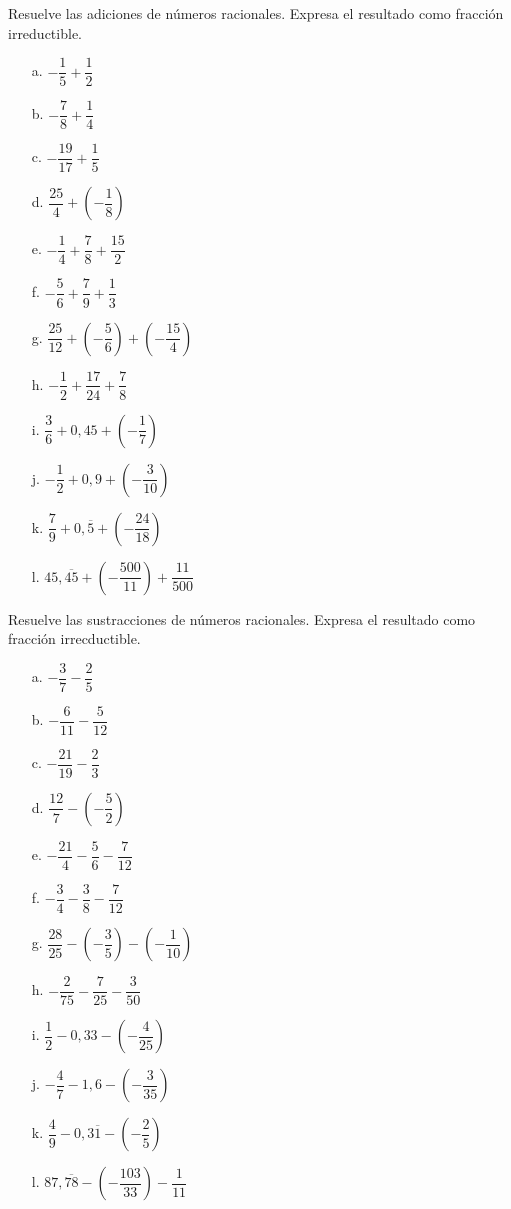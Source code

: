 \documentclass[spanish,letterpaper, 11pt, addpoints, answers]{exam}
\begin{document}
\begin{questions}
  \question Resuelve las adiciones de números racionales. Expresa el resultado como fracción irreductible.
  \begin{multicols}{2}
    \begin{itemize}
      \item[a.] $-\dfrac{1}{5}+\dfrac{1}{2}$
      \item[b.] $-\dfrac{7}{8}+\dfrac{1}{4}$
      \item[c.] $-\dfrac{19}{17}+\dfrac{1}{5}$
      \item[d.] $\dfrac{25}{4}+\left(-\dfrac{1}{8}\right)$
      \item[e.] $-\dfrac{1}{4}+\dfrac{7}{8}+\dfrac{15}{2}$
      \item[f.] $-\dfrac{5}{6}+\dfrac{7}{9}+\dfrac{1}{3}$
      \item[g.] $\dfrac{25}{12}+\left(-\dfrac{5}{6}\right)+\left(-\dfrac{15}{4}\right)$
      \item[h.] $-\dfrac{1}{2}+\dfrac{17}{24}+\dfrac{7}{8}$
      \item[i.] $\dfrac{3}{6}+0{,}45+\left(-\dfrac{1}{7}\right)$
      \item[j.] $-\dfrac{1}{2}+0{,}9+\left(-\dfrac{3}{10}\right)$
      \item[k.] $\dfrac{7}{9}+0{,}\overline{5}+\left(-\dfrac{24}{18}\right)$
      \item[l.] $45{,}\overline{45}+\left(-\dfrac{500}{11}\right)+\dfrac{11}{500}$
    \end{itemize}

  \end{multicols}

  \question Resuelve las sustracciones de números racionales. Expresa el resultado como fracción irrecductible.
  \begin{multicols}{2}
    \begin{itemize}
      \item[a.] $-\dfrac{3}{7}-\dfrac{2}{5}$
      \item[b.] $-\dfrac{6}{11}-\dfrac{5}{12}$
      \item[c.] $-\dfrac{21}{19}-\dfrac{2}{3}$
      \item[d.] $\dfrac{12}{7}-\left(-\dfrac{5}{2}\right)$
      \item[e.] $-\dfrac{21}{4}-\dfrac{5}{6}-\dfrac{7}{12}$
      \item[f.] $-\dfrac{3}{4}-\dfrac{3}{8}-\dfrac{7}{12}$
      \item[g.] $\dfrac{28}{25}-\left(-\dfrac{3}{5}\right)-\left(-\dfrac{1}{10}\right)$
      \item[h.] $-\dfrac{2}{75}-\dfrac{7}{25}-\dfrac{3}{50}$
      \item[i.] $\dfrac{1}{2}-0{,}33-\left(-\dfrac{4}{25}\right)$
      \item[j.] $-\dfrac{4}{7}-1{,}6-\left(-\dfrac{3}{35}\right)$
      \item[k.] $\dfrac{4}{9}-0{,}3\overline{1}-\left(-\dfrac{2}{5}\right)$
      \item[l.] $87{,}\overline{78}-\left(-\dfrac{103}{33}\right)-\dfrac{1}{11}$
    \end{itemize}


\end{multicols}
\end{questions}
\end{document}
